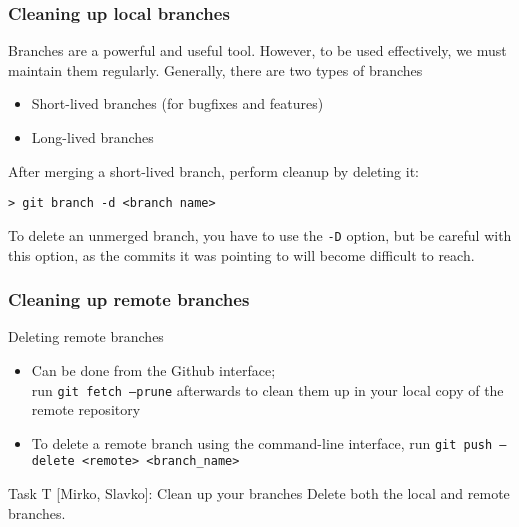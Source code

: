 
\begin{frame}[fragile]

\frametitle{Cleaning up local branches}

Branches are a powerful and useful tool. However, to be used effectively, we must maintain them regularly. Generally, there are two types of branches
\begin{itemize}
	\item Short-lived branches (for bugfixes and features)
	\item Long-lived branches
\end{itemize}

After merging a short-lived branch, perform cleanup by deleting it:
\begin{verbatim}
> git branch -d <branch name>
\end{verbatim}

To delete an unmerged branch, you have to use the \texttt{-D} option, but be careful with this option, as the commits it was pointing to will become difficult to reach.

\end{frame}



\begin{frame}[fragile]

\frametitle{Cleaning up remote branches}

\begin{block}{Deleting remote branches}
	\begin{itemize}
	\item Can be done from the Github interface;
	\\ run \texttt{git fetch --prune} afterwards to clean them up in your local copy of the remote repository
	\item To delete a remote branch using the command-line interface, run \texttt{git push --delete <remote> <branch\_name>}
	\end{itemize}
\end{block}	

\begin{block}{Task T [Mirko, Slavko]: Clean up your branches}
	Delete both the local and remote branches.
\end{block}	
\end{frame}

